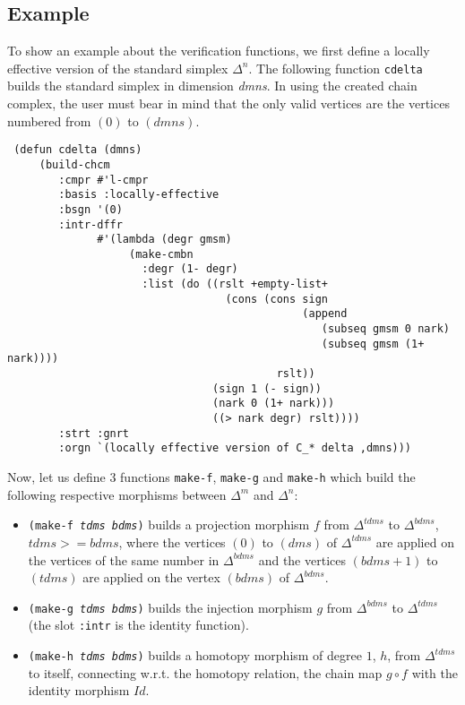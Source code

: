 \subsection* {Example}

To show an example about the verification functions, we first define a locally effective version
of the standard simplex $\Delta^n$. The following function {\tt cdelta} builds the standard simplex
in dimension {\em dmns}. In using the created chain complex, the user must bear in mind that
the only valid vertices are the vertices numbered from $(0)$ to $(dmns)$. 
{\footnotesize\begin{verbatim}
 (defun cdelta (dmns)
     (build-chcm
        :cmpr #'l-cmpr
        :basis :locally-effective
        :bsgn '(0)
        :intr-dffr 
              #'(lambda (degr gmsm)
                   (make-cmbn
                     :degr (1- degr)
                     :list (do ((rslt +empty-list+
                                  (cons (cons sign 
                                              (append
                                                 (subseq gmsm 0 nark)
                                                 (subseq gmsm (1+ nark))))
                                          rslt))
                                (sign 1 (- sign))
                                (nark 0 (1+ nark)))
                                ((> nark degr) rslt))))                                           
        :strt :gnrt
        :orgn `(locally effective version of C_* delta ,dmns)))
\end{verbatim}}
Now, let us define $3$ functions {\tt make-f}, {\tt make-g} and {\tt make-h} which build the
following respective morphisms between $\Delta^m$ and $\Delta^n$:
\begin{itemize}
\item {\tt (make-f {\em tdms bdms})} builds a projection morphism $f$ from $\Delta^{tdms}$ to $\Delta^{bdms}$,
$tdms>=bdms$, where the vertices $(0)$ to $(dms)$ of $\Delta^{tdms}$ are applied on the vertices of the same
number in $\Delta^{bdms}$ and the vertices $(bdms+1)$ to $(tdms)$ are applied on the vertex $(bdms)$ of
$\Delta^{bdms}$.
\item {\tt (make-g {\em tdms bdms})} builds the injection morphism $g$ from $\Delta^{bdms}$ to $\Delta^{tdms}$
(the slot {\tt :intr} is the identity function).
\item {\tt (make-h {\em tdms bdms})} builds a homotopy morphism of degree $1$, $h$, 
from $\Delta^{tdms}$ to itself, connecting w.r.t. the homotopy relation, the chain map
$g \circ f$ with the identity morphism $Id$.
\end{itemize}
